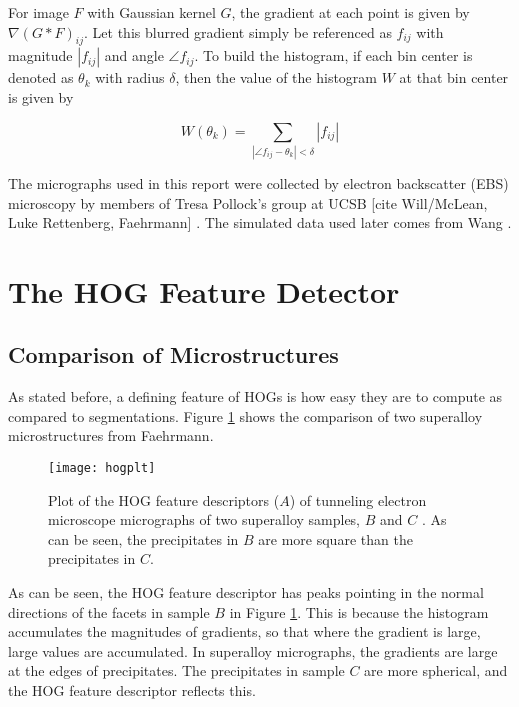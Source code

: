 \documentclass[review]{elsarticle}
\begin{document}
	For image $F$ with Gaussian kernel $G$, the gradient at each point is given by $\nabla \left( G \ast F \right)_{ij}$. Let this blurred gradient simply be referenced as $f_{ij}$ with magnitude $\left| f_{ij} \right|$ and angle $\angle f_{ij}$. To build the histogram, if each bin center is denoted as $\theta_k$ with radius $\delta$, then the value of the histogram $W$ at that bin center is given by

	\begin{equation}
		W \left( \theta_k \right) = \sum_{\left| \angle f_{ij} - \theta_k \right| < \delta} \left| f_{ij} \right|
	\end{equation}

	The micrographs used in this report were collected by electron backscatter (EBS) microscopy by members of Tresa Pollock's group at UCSB [cite Will/McLean, Luke Rettenberg, Faehrmann] \cite{tribeam}. The simulated data used later comes from Wang \cite{ywang2}.

	\section{The HOG Feature Detector}\label{hog}
	\subsection{Comparison of Microstructures}
	As stated before, a defining feature of HOGs is how easy they are to compute as compared to segmentations. Figure \ref{figure2} shows the comparison of two superalloy microstructures from Faehrmann\cite{molly}.

	\begin{figure}[!ht]
  		\centering
    	\texttt{[image: hogplt]}
  		\caption{ Plot of the HOG feature descriptors ($A$) of tunneling electron microscope micrographs of two superalloy samples, $B$ and $C$ \cite{molly}. As can be seen, the precipitates in $B$ are more square than the precipitates in $C$. }
  		\label{figure2}
	\end{figure}

	As can be seen, the HOG feature descriptor has peaks pointing in the normal directions of the facets in sample $B$ in Figure \ref{figure2}. This is because the histogram accumulates the magnitudes of gradients, so that where the gradient is large, large values are accumulated. In superalloy micrographs, the gradients are large at the edges of precipitates. The precipitates in sample $C$ are more spherical, and the HOG feature descriptor reflects this.
	
\end{document}
